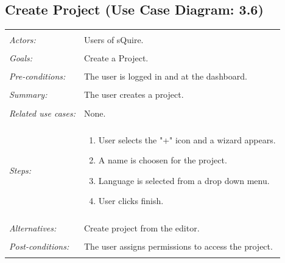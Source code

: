 \documentclass[11pt]{report}
\begin{document}
\subsection{Create Project (Use Case Diagram: 3.6)}
\begin{tabular}{ p{2cm} p{12cm} }
 \hline
 \\
 \textit{Actors:} & Users of sQuire. \\ 
 \\
 \textit{Goals:} & Create a Project. \\
 \\
 \textit{Pre-conditions:} & The user is logged in and at the dashboard. \\
 \\
 \textit{Summary:} & The user creates a project. \\ 
 \\
 \textit{Related use cases:} & None. \\ 
 \\
 \textit{Steps:} & \begin{enumerate}
  \item User selects the "+" icon and a wizard appears.
  \item A name is choosen for the project.
  \item Language is selected from a drop down menu.
  \item User clicks finish.
 \end{enumerate} \\
 \\
 \textit{Alternatives:} & Create project from the editor. \\
 \\
 \textit{Post-conditions:} & The user assigns permissions to access the project. \\
 \\
\hline
\end{tabular}
\end{document}
